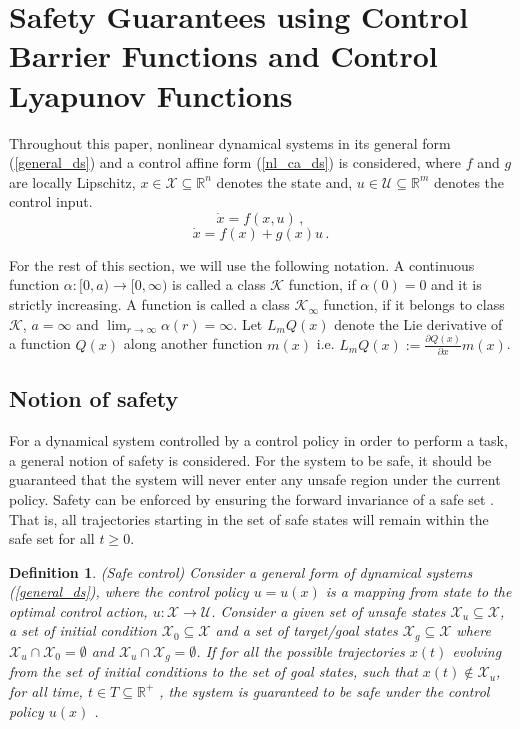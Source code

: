 \documentclass[3p,times,procedia]{elsarticle}
\newtheorem{definition}{Definition}
\begin{document}
\section{Safety Guarantees using Control Barrier Functions and Control Lyapunov Functions}\label{background}

Throughout this paper, nonlinear dynamical systems in its general form (\ref{general_ds}) and a control affine form (\ref{nl_ca_ds}) is considered, where  $f$ and $g$ are locally Lipschitz, $x \in \mathcal{X} \subseteq \mathbb{R}^{n}$ denotes the state and, $ u \in \mathcal{U} \subseteq \mathbb{R}^{m}$ denotes the control input. 
\begin{equation} \label{general_ds}
    \dot{x}=f(x,u) \, ,
\end{equation}
\begin{equation} \label{nl_ca_ds}
\dot{x}=f(x)+g(x) u \, .
\end{equation}

For the rest of this section, we will use the following notation.
A continuous function $\alpha:[0, a) \rightarrow [0, \infty)$ is called a class $\mathcal{K}$ function, if $\alpha(0) = 0$ and it is strictly increasing. A function is called a class $\mathcal{K}_\infty$ function, if it belongs to class $\mathcal{K}$, $a = \infty$ and $\lim _{r \rightarrow \infty} \alpha(r)=\infty$. Let $L_mQ(x)$ denote the Lie derivative of a function $Q(x)$ along another function $m(x)$ i.e. $L_mQ(x):=\frac{\partial Q(x)}{\partial x}m(x)$. 

\subsection{Notion of safety} 
For a dynamical system controlled by a control policy in order to perform a task, a general notion of safety is considered. For the system to be safe, it should be guaranteed that the system will never enter any unsafe region under the current policy. Safety can be enforced by ensuring the forward invariance of a safe set \cite{Ames2019}.  That is,  all trajectories starting in the set of safe states will remain within the safe set for all $t \geq 0$. 

\begin{definition} \label{notion of safety}
(Safe control) Consider a general form of dynamical systems (\ref{general_ds}), where the control policy $u = u(x)$ is a mapping from state to the optimal control action, $u : \mathcal{X} \to \mathcal{U}$. Consider a given set of unsafe states $\mathcal{X}_{u} \subseteq \mathcal{X}$, a set of initial condition $\mathcal{X}_{0} \subseteq \mathcal{X}$  and a set of target/goal states  $\mathcal{X}_{g} \subseteq \mathcal{X}$ where $\mathcal{X}_{u} \cap \mathcal{X}_{0}=\emptyset$ and $\mathcal{X}_{u} \cap \mathcal{X}_{g}=\emptyset$. If for all the possible trajectories $x(t)$ evolving from the set of initial conditions to the set of goal states, such that $x(t) \not\in \mathcal{X}_{u}$, for all time, $ t \in T \subseteq \mathbb{R}^{+}$ , the system is guaranteed to be safe under the control policy $u(x)$ . 
\end{definition}
\end{document}
